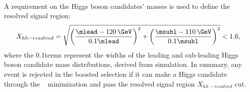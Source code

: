 \paragraph{}
A requirement on the Higgs boson candidates' masses is used to define the resolved signal region:
\begin{equation}
X_{hh-resolved} = \sqrt{\left(\frac{\mlead - 120\,\GeV}{0.1\mlead}\right)^2 + \left(\frac{\msubl - 110\,\GeV}{0.1\msubl}\right)^2} < 1.6,
\label{eqn:resolvedXhh}
\end{equation}
where the 0.1\mtwoj terms represent the widths of the leading and sub-leading Higgs boson candidate mass distributions, derived from simulation.
In summary, any event is rejected in the boosted selection if it can make a Higgs candidate through the \Dhh~ minimization and pass the resolved signal region $X_{hh-resolved}$ cut.



